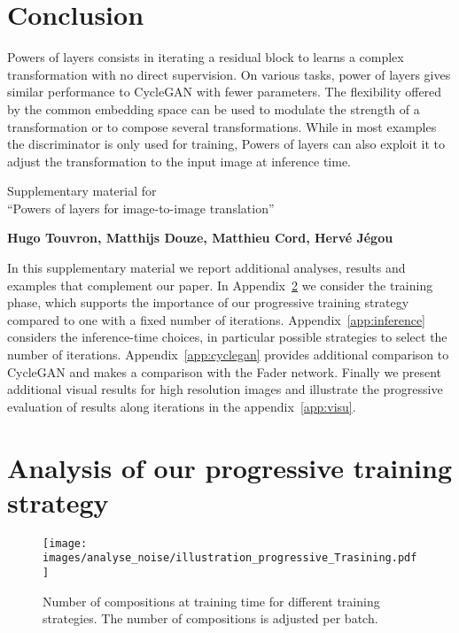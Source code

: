 \documentclass[a4paper,10pt]{extarticle}
\begin{document}
 
\section{Conclusion}

Powers of layers consists in iterating a residual block to learns a complex transformation with no direct supervision. 
On various tasks, power of layers gives similar performance to CycleGAN with fewer parameters. 
The flexibility offered by the common embedding space can be used to modulate the strength of a transformation or to compose several transformations.
While in most examples the discriminator is only used for training, 
Powers of layers can also exploit it to adjust the transformation to the input image at inference time. 


\clearpage


\clearpage \newpage \appendix\newpage

\begin{center}
{\LARGE
Supplementary material for \\
``Powers of layers for image-to-image translation'' 
\vspace{1cm} \newline 
}

\textbf{Hugo Touvron, Matthijs Douze, Matthieu Cord, Herv\'e J\'egou \vspace{1em}}
\end{center}
\vspace*{1cm}

In this supplementary material we report additional analyses, results and examples that complement our paper. 
In Appendix~\ref{app:training} we consider the training phase, which supports the importance of our progressive training strategy compared to one with a fixed number of iterations. 
Appendix~\ref{app:inference} considers the inference-time choices, in particular possible strategies to select the number of iterations. 
Appendix~\ref{app:cyclegan} provides additional comparison to CycleGAN and makes a comparison with the Fader network. 
Finally we present additional visual results for high resolution images and illustrate the progressive evaluation of results along iterations in the appendix~\ref{app:visu}. 

\section{Analysis of our progressive training strategy}
\label{app:training}

\begin{figure}[b]
\centering
\texttt{[image: images/analyse\_noise/illustration\_progressive\_Trasining.pdf]}

\caption{\label{fig:illustration_training}
  Number of compositions at training time for different training strategies.
  The number of compositions is adjusted per batch. 
}
\end{figure} 
\end{document}
